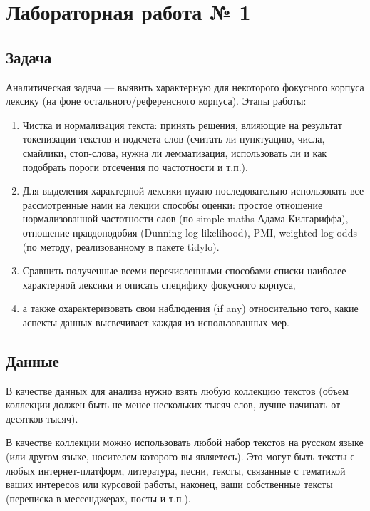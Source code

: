 \documentclass{report}
\begin{document}
\section{Лабораторная работа № 1}

\subsection{Задача}

Аналитическая задача — выявить характерную для некоторого фокусного
корпуса лексику (на фоне остального/референсного корпуса).
Этапы работы:

\begin{enumerate}
\item Чистка и нормализация текста: принять решения, влияющие на
  результат токенизации текстов и подсчета слов (считать ли
  пунктуацию, числа, смайлики, стоп-слова, нужна ли лемматизация,
  использовать ли и как подобрать пороги отсечения по частотности и т.п.).
\item Для выделения характерной лексики нужно последовательно
  использовать все рассмотренные нами на лекции способы оценки:
  простое отношение нормализованной частотности слов (по simple maths
  Адама Килгариффа), отношение правдоподобия (Dunning log-likelihood),
  PMI, weighted log-odds (по методу, реализованному в пакете tidylo).
\item Сравнить полученные всеми перечисленными способами списки
  наиболее характерной лексики и описать специфику фокусного корпуса,
\item а также охарактеризовать свои наблюдения (if any) относительно того,
  какие аспекты данных высвечивает каждая из использованных мер.
\end{enumerate}

\subsection{Данные}

В качестве данных для анализа нужно взять любую коллекцию текстов
(объем коллекции должен быть не менее нескольких тысяч слов, лучше
начинать от десятков тысяч).

В качестве коллекции можно использовать любой набор текстов на русском
языке (или другом языке, носителем которого вы являетесь). Это могут
быть тексты с любых интернет-платформ, литература, песни, тексты,
связанные с тематикой ваших интересов или курсовой работы, наконец,
ваши собственные тексты (переписка в мессенджерах, посты и т.п.).
\end{document}
